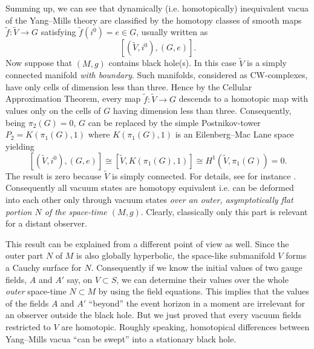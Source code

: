 \documentclass[a4paper,12pt,draft]{article}
\begin{document}
Summing up, we can see that dynamically (i.e. homotopically) inequivalent
vacua of the Yang--Mills theory are classified by the
homotopy classes of smooth maps $\tilde{f}: \widetilde{V}\rightarrow G$
satisfying $\tilde{f}(i^0)=e\in G$, usually written as  
\begin{equation}
\left[(\widetilde{V}, i^0), (G, e)\right].
\label{vakuum}
\end{equation}
Now suppose that $(M, g)$ contains black hole(s). In this case
$\widetilde{V}$ is a simply connected manifold {\it with boundary}. 
Such manifolds, considered as CW-complexes, have only cells of dimension
less than three. Hence by the Cellular Approximation Theorem, every
map $\tilde{f}: \widetilde{V}\rightarrow G$ descends to a homotopic map
with values only on the cells of $G$ having dimension less than three.
Consequently, being $\pi_2(G)=0$, $G$ can be replaced by the simple
Postnikov-tower $P_2=K(\pi_1(G), 1)$ where $K(\pi_1(G), 1)$ is an
Eilenberg--Mac Lane space yielding
\begin{equation}
\left[(\widetilde{V}, i^0), (G,e)\right]\cong
\left[\widetilde{V},
K(\pi_1(G), 1)\right]\cong H^1(\widetilde{V},
\pi_1(G))=0.
\label{szamolas}
\end{equation}
The result is zero because $\widetilde{V}$ is simply connected. For
details, see for instance \cite{spa}. Consequently all vacuum states are
homotopy equivalent i.e. can be deformed into each other only through
vacuum states {\it over an outer, asymptotically flat portion $N$ of
the space-time $(M,g)$}. Clearly, classically only this part is relevant
for a distant observer. 

This result can be explained from a different point of view as well. Since
the outer part $N$ of $M$ is also globally hyperbolic, the space-like
submanifold $V$ forms a Cauchy surface for $N$. Consequently if we know
the initial values of two gauge fields, $A$ and  $A'$ say, on $V\subset
S$, we can determine their values over the whole {\it outer} space-time
$N\subset M$ by using the field equations. This implies that the values of
the fields $A$ and $A'$ ``beyond'' the event horizon in a moment are
irrelevant for an observer outside the black hole. But we just proved that
every vacuum fields restricted to $V$ are homotopic. Roughly speaking,
homotopical differences between Yang--Mills vacua ``can be swept'' into a
stationary black hole. 
\end{document}
